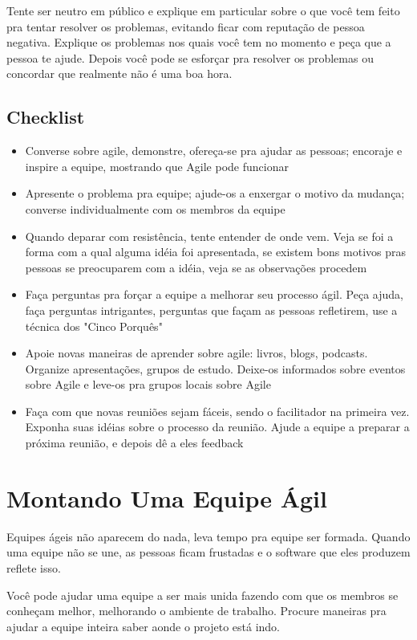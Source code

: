 \documentclass[a4paper, 10pt, font=plain]{abnt}
\begin{document}
Tente ser neutro em público e explique em particular sobre o que você tem feito pra tentar resolver os problemas, evitando ficar com reputação de pessoa negativa. Explique os problemas nos quais você tem no momento e peça que a pessoa te ajude. Depois você pode se esforçar pra resolver os problemas ou concordar que realmente não é uma boa hora.


\section{Checklist}
\begin{itemize}
\item Converse sobre agile, demonstre, ofereça-se pra ajudar as pessoas; encoraje e inspire a equipe, mostrando que Agile pode funcionar
\item Apresente o problema pra equipe; ajude-os a enxergar o motivo da mudança; converse individualmente com os membros da equipe
\item Quando deparar com resistência, tente entender de onde vem. Veja se foi a forma com a qual alguma idéia foi apresentada, se existem bons motivos pras pessoas se preocuparem com a idéia, veja se as observações procedem
\item Faça perguntas pra forçar a equipe a melhorar seu processo ágil. Peça ajuda, faça perguntas intrigantes, perguntas que façam as pessoas refletirem, use a técnica dos "Cinco Porquês"
\item Apoie novas maneiras de aprender sobre agile: livros, blogs, podcasts. Organize apresentações, grupos de estudo. Deixe-os informados sobre eventos sobre Agile e leve-os pra grupos locais sobre Agile
\item Faça com que novas reuniões sejam fáceis, sendo o facilitador na primeira vez. Exponha suas idéias sobre o processo da reunião. Ajude a equipe a preparar a próxima reunião, e depois dê a eles feedback
\end{itemize}




\chapter{Montando Uma Equipe Ágil}
Equipes ágeis não aparecem do nada, leva tempo pra equipe ser formada. Quando uma equipe não se une, as pessoas ficam frustadas e o software que eles produzem reflete isso.

Você pode ajudar uma equipe a ser mais unida fazendo com que os membros se conheçam melhor, melhorando o ambiente de trabalho. Procure maneiras pra ajudar a equipe inteira saber aonde o projeto está indo.
\end{document}
